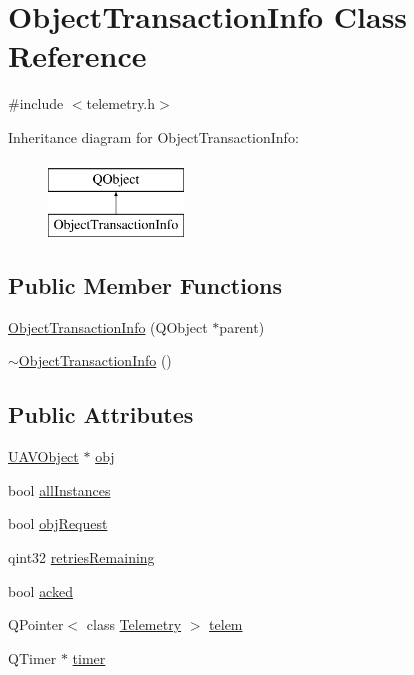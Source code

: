 \hypertarget{class_object_transaction_info}{\section{Object\-Transaction\-Info Class Reference}
\label{class_object_transaction_info}
}


{\ttfamily \#include $<$telemetry.\-h$>$}

Inheritance diagram for Object\-Transaction\-Info\-:\begin{figure}[H]
\begin{center}
\leavevmode
\includegraphics[height=2.000000cm]{class_object_transaction_info}
\end{center}
\end{figure}
\subsection*{Public Member Functions}
\begin{DoxyCompactItemize}
\item 
\hyperlink{group___u_a_v_talk_plugin_ga56a113c31769c8841a65cf085c53a33e}{Object\-Transaction\-Info} (Q\-Object $\ast$parent)
\item 
\hyperlink{group___u_a_v_talk_plugin_ga8b1a7a6e63feac107ca370ce1a68758f}{$\sim$\-Object\-Transaction\-Info} ()
\end{DoxyCompactItemize}
\subsection*{Public Attributes}
\begin{DoxyCompactItemize}
\item 
\hyperlink{class_u_a_v_object}{U\-A\-V\-Object} $\ast$ \hyperlink{group___u_a_v_talk_plugin_ga9ad43239e470da9249f214e43521bddb}{obj}
\item 
bool \hyperlink{group___u_a_v_talk_plugin_gaf134962f4df09323cf89245e3bc32f6e}{all\-Instances}
\item 
bool \hyperlink{group___u_a_v_talk_plugin_ga35e10d2ea8bcd4f4bd1e32db43857e2c}{obj\-Request}
\item 
qint32 \hyperlink{group___u_a_v_talk_plugin_gaf7cfad07635a777272c96c4b2fb2284b}{retries\-Remaining}
\item 
bool \hyperlink{group___u_a_v_talk_plugin_ga27c9898b3e1a5940f0340891578f6ea5}{acked}
\item 
Q\-Pointer$<$ class \hyperlink{class_telemetry}{Telemetry} $>$ \hyperlink{group___u_a_v_talk_plugin_ga1df77178093618626fe21d5bc58b03f4}{telem}
\item 
Q\-Timer $\ast$ \hyperlink{group___u_a_v_talk_plugin_gaf400de9c7d9b37a52e821b1a7bc6580e}{timer}
\end{DoxyCompactItemize}


